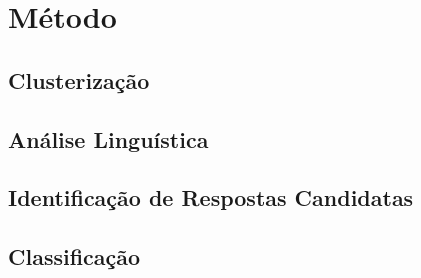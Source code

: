 \chapter{Método}
\label{cap-proposta}

\section{Clusterização}

\section{Análise Linguística}

\section{Identificação de Respostas Candidatas}

\section{Classificação}